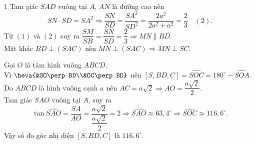 \begin{ex}
{\begin{enumEX}{1}
		Tam giác $SAD$ vuông tại $A$, $AN$ là đường cao nên 
		$$SN\cdot SD=SA^2\Rightarrow \dfrac{SN}{SD}=\dfrac{SA^2}{SD^2}=\dfrac{2a^2}{2a^2+a^2}=\dfrac{2}{3}\quad (2).$$
		Từ $(1)$ và $(2)$ suy ra $\dfrac{SM}{SB}=\dfrac{SN}{SD}=\dfrac{2}{3}\Rightarrow MN\parallel BD$.\\
		Mặt khác $BD\perp (SAC)$ nên $MN\perp (SAC)\Rightarrow MN\perp SC$.
		\item Gọi $O$ là tâm hình vuông $ABCD$.\\
		Vì $\heva{&SO\perp BD\\&OC\perp BD}$ nên $[S,BD,C]=\widehat{SOC}=180^\circ-\widehat{SOA}$.\\
		Do $ABCD$ là hình vuông cạnh $a$ nên $AC=a\sqrt{2}\Rightarrow AO=\dfrac{a\sqrt{2}}{2}$.\\
		Tam giác $SAO$ vuông tại $A$, suy ra 
		$$ \tan\widehat{SAO}=\dfrac{SA}{AO}=\dfrac{a\sqrt{2}}{\dfrac{a\sqrt{2}}{2}}=2\Rightarrow \widehat{SAO}\approx 63{,}4^\circ\Rightarrow \widehat{SOC}\approx 116{,}6^\circ.$$
		Vậy số đo góc nhị diện $[S,BD,C]$ là $116{,}6^\circ$.
	\end{enumEX}
	}
\end{ex}

